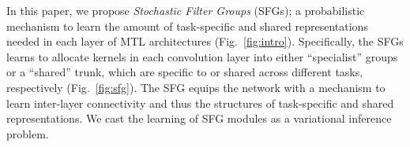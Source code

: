 



In this paper, we propose \textit{Stochastic Filter Groups} (SFGs); a probabilistic mechanism to learn the amount of task-specific and shared representations needed in each layer of MTL architectures (Fig.~\ref{fig:intro}). Specifically, the SFGs learns to allocate kernels in each convolution layer into either ``specialist'' groups or a ``shared'' trunk, which are specific to or shared across different tasks, respectively (Fig.~\ref{fig:sfg}). The SFG equips the network with a mechanism to learn inter-layer connectivity and thus the structures of task-specific and shared representations. We cast the learning of SFG modules as a variational inference problem.

